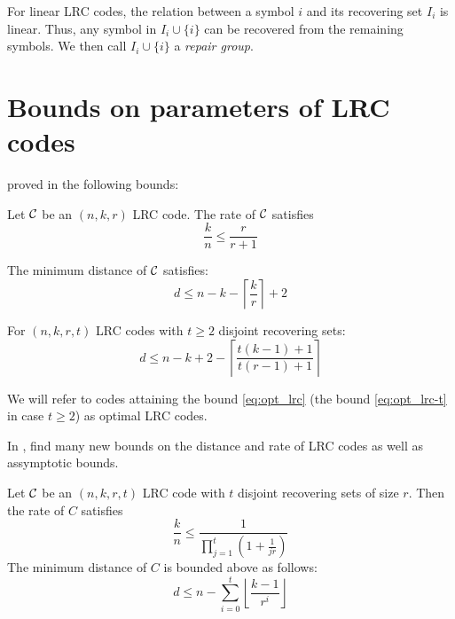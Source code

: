 For linear LRC codes, the relation between a symbol $i$ and its recovering set $I_i$ is linear. Thus, any symbol in $I_i \cup \{i\}$ can be recovered from the remaining symbols. We then call $I_i \cup \{i\}$ a \textit{repair group}.

\section{Bounds on parameters of LRC codes}
\citeauthor*{GHSY12} proved in \cite{GHSY12} the following bounds:
\begin{thm}
Let ${\mathcal C}$ be an $(n,k,r)$ LRC code. The rate of ${\mathcal C}$ satisfies
\begin{equation}
    \frac{k}{n} \leq \frac{r}{r+1}
\end{equation}

\noindent The minimum distance of ${\mathcal C}$ satisfies:
\begin{equation}\label{eq:opt_lrc}
d \leq n -k - \left\lceil \frac{k}{r} \right\rceil + 2
\end{equation}


\end{thm}


\begin{thm}

For $(n,k,r,t)$ LRC codes with $t \geq 2$ disjoint recovering sets:
\begin{equation}\label{eq:opt_lrc-t}
    d \leq n-k + 2 - \left\lceil \frac{t(k-1)+1}{t(r-1)+1} \right\rceil
\end{equation}
\end{thm}

We will refer to codes attaining the bound \ref{eq:opt_lrc} (the bound \ref{eq:opt_lrc-t} in case $t \geq 2$) as optimal LRC codes.

In \cite{bounds_on_LRC}, \citeauthor{bounds_on_LRC} find many new bounds on the distance and rate of LRC codes as well as assymptotic bounds.

\begin{thm}\label{thm:lrc_rate}
Let ${\mathcal C}$ be an $(n,k,r,t)$ LRC code with $t$ disjoint recovering sets of size $r$. Then the rate of $C$ satisfies
\begin{equation}\label{eq:rate_lrc}
\frac{k}{n} \leq \frac{1}{\prod_{j=1}^t(1+\frac{1}{jr})}
\end{equation}
The minimum distance of $C$ is bounded above as follows:
\begin{equation}\label{eq:ass_rate_lrc}
d \leq n - \sum_{i=0}^t \left\lfloor \frac{k-1}{r^i} \right\rfloor
\end{equation}
\end{thm}


